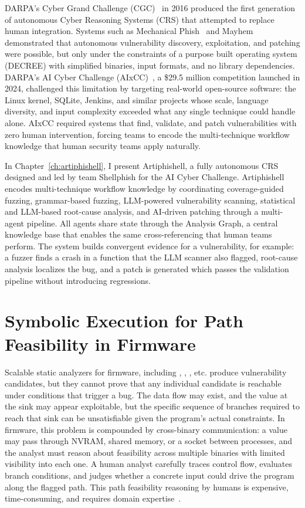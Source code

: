 DARPA's Cyber Grand Challenge (CGC)~\cite{darpa2016cgc} in 2016 produced the first generation of autonomous Cyber Reasoning Systems (CRS) that
attempted to replace human integration.
Systems such as Mechanical Phish~\cite{shoshitaishvili2018mechanical} and Mayhem~\cite{cha2012mayhem} demonstrated that autonomous
vulnerability discovery, exploitation, and patching were possible, but only under the constraints of a purpose built operating system (DECREE)
with simplified binaries, input formats, and no library dependencies.
DARPA's AI Cyber Challenge (AIxCC)~\cite{aixcc}, a \$29.5 million competition launched in 2024, challenged
this limitation by targeting real-world open-source software: the Linux kernel, SQLite, Jenkins, and similar projects whose scale, language diversity,
and input complexity exceeded what any single technique could handle alone.
AIxCC required systems that find, validate, and patch vulnerabilities with zero human intervention, forcing teams to encode the multi-technique workflow
knowledge that human security teams apply naturally.

In Chapter~\ref{ch:artiphishell}, I present Artiphishell, a fully autonomous CRS designed and led by team Shellphish for the AI Cyber Challenge.
Artiphishell encodes multi-technique workflow knowledge by coordinating coverage-guided fuzzing, grammar-based fuzzing, LLM-powered vulnerability
scanning, statistical and LLM-based root-cause analysis, and AI-driven patching through a multi-agent pipeline.
All agents share state through the Analysis Graph, a central knowledge base that enables the same cross-referencing that human teams perform.
The system builds convergent evidence for a vulnerability, for example: a fuzzer finds a crash in a function that the LLM scanner also flagged, root-cause analysis
localizes the bug, and a patch is generated which passes the validation pipeline without introducing regressions. 


\section{Symbolic Execution for Path Feasibility in Firmware}

Scalable static analyzers for firmware, including \toolname, \satc, \karonte, etc. produce vulnerability candidates, but they cannot prove that any individual candidate is
reachable under conditions that trigger a bug.
The data flow may exist, and the value at the sink may appear exploitable, but the specific sequence of branches required to reach that sink
can be unsatisfiable given the program's actual constraints.
In firmware, this problem is compounded by cross-binary communication: a value may pass through NVRAM, shared memory, or a socket between processes,
and the analyst must reason about feasibility across multiple binaries with limited visibility into each one.
A human analyst carefully traces control flow, evaluates branch conditions, and judges whether a concrete input could drive the program along the flagged path.
This path feasibility reasoning by humans is expensive, time-consuming, and requires domain expertise~\cite{votipka2019observational}.

